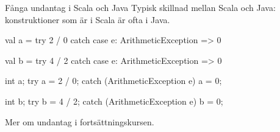 \begin{Slide}{Fånga undantag i Scala och Java}
Typisk skillnad mellan Scala och Java:\\konstruktioner som är  i Scala är ofta  i Java.
\begin{multicols}{2}
  \noindent{}
\begin{CodeSmall}[basicstyle=\ttfamily\SlideFontSize{6}{8},backgroundcolor=\color{white},
  frame=none]
val a = try { 2 / 0 } catch {
  case e: ArithmeticException => 0
}

val b = try { 4 / 2 } catch {
  case e: ArithmeticException => 0
}
\end{CodeSmall}

\columnbreak

\noindent{}
\begin{CodeSmall}[language=Java,basicstyle=\ttfamily\SlideFontSize{6}{8},backgroundcolor=\color{white},
  frame=none]
int a;
try {
    a = 2 / 0;
} catch (ArithmeticException e) {
    a = 0;
}

int b;
try {
    b = 4 / 2;
} catch (ArithmeticException e) {
    b = 0;
}

\end{CodeSmall}
\end{multicols}

Mer om undantag  i fortsättningskursen.
\end{Slide}





